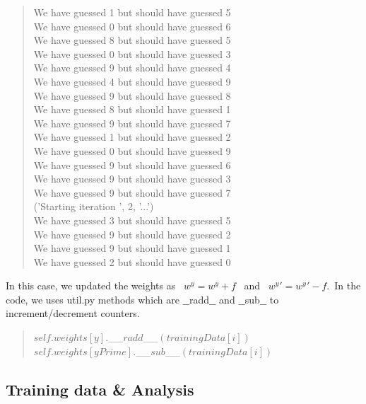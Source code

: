 \documentclass{article}
\begin{document}
\begin{quote}
        We have guessed 1 but should have guessed 5\\
        We have guessed 0 but should have guessed 6\\
        We have guessed 8 but should have guessed 5\\
        We have guessed 0 but should have guessed 3\\
        We have guessed 9 but should have guessed 4\\
        We have guessed 4 but should have guessed 9\\
        We have guessed 9 but should have guessed 8\\
        We have guessed 8 but should have guessed 1\\
        We have guessed 9 but should have guessed 7\\
        We have guessed 1 but should have guessed 2\\
        We have guessed 0 but should have guessed 9\\
        We have guessed 9 but should have guessed 6\\
        We have guessed 9 but should have guessed 3\\
        We have guessed 9 but should have guessed 7\\
        ('Starting iteration ', 2, '...')\\
        We have guessed 3 but should have guessed 5\\
        We have guessed 9 but should have guessed 2\\
        We have guessed 9 but should have guessed 1\\
        We have guessed 2 but should have guessed 0\\
        \end{quote}
            
        In this case, we updated the weights as \ $w^y = w^y + f$ \ and \ $w^y' = w^y' - f$.\ In the code, we uses util.py methods which are $\_\_$radd$\_\_$ and $\_\_$sub$\_\_$ to increment/decrement counters.
        \begin{quote}
            $self.weights[y].$\_\_$radd$\_\_$(trainingData[i])$\\
            $self.weights[yPrime].$\_\_$sub$\_\_$(trainingData[i])$
        \end{quote}
            
    \subsection{Training data \& Analysis}
\end{document}
